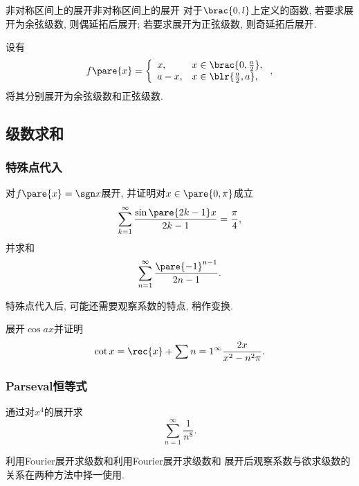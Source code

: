 \documentclass[hidelinks]{ctexart}
\begin{document}
\begin{reflex}{非对称区间上的展开}{非对称区间上的展开}
    对于$\brac{0,l}$上定义的函数, 若要求展开为余弦级数, 则偶延拓后展开; 若要求展开为正弦级数, 则奇延拓后展开.
\end{reflex}
\begin{ex}
    设有
    \[ f\pare{x} = \left\{\begin{array}{ll}
        x, & x\in\brac{0,\frac{a}{2}},\\
        a-x, & x\in\blr{\frac{a}{2},a},
    \end{array} \right. , \]
    将其分别展开为余弦级数和正弦级数.
\end{ex}



\subsection{级数求和} %
\label{sub:级数求和}

\subsubsection{特殊点代入} %
\label{ssub:特殊点代入}

\begin{ex}
    对$f\pare{x}=\sgn x$展开, 并证明对$x\in\pare{0,\pi}$成立
    \[ \sum_{k=1}^\infty \frac{\sin \pare{2k-1}x}{2k-1} = \frac{\pi}{4}, \]
    并求和
    \[ \sum_{n=1}^\infty \frac{\pare{-1}^{n-1}}{2n-1}. \]
\end{ex}

特殊点代入后, 可能还需要观察系数的特点, 稍作变换.

\begin{ex}
    展开$\cos ax$并证明
    \[ \cot x = \rec{x} + \sum{n=1}^\infty \frac{2x}{x^2- n^2\pi}. \]
\end{ex}


\subsubsection{Parseval恒等式} %
\label{ssub:parseval恒等式}

\begin{ex}
    通过对$x^4$的展开求
    \[ \sum_{n=1}^\infty \frac{1}{n^8}. \]
\end{ex}

\begin{reflex}{利用Fourier展开求级数和}{利用Fourier展开求级数和}
    展开后观察系数与欲求级数的关系在两种方法中择一使用.
\end{reflex}



\end{document}
